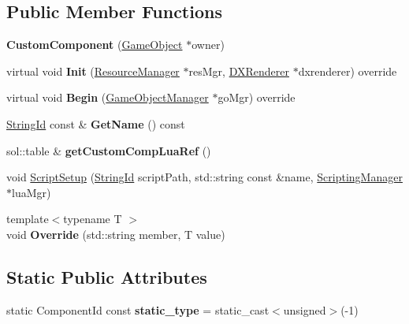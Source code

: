 \subsection*{Public Member Functions}
\begin{DoxyCompactItemize}
\item 
\mbox{\label{classCustomComponent_a748e48455ac06076251485d3a112140f}} 
{\bfseries Custom\+Component} (\hyperlink{classGameObject}{Game\+Object} $\ast$owner)
\item 
\mbox{\label{classCustomComponent_a614f2af8f444be376d83cc00f6b9c7ea}} 
virtual void {\bfseries Init} (\hyperlink{classResourceManager}{Resource\+Manager} $\ast$res\+Mgr, \hyperlink{classDXRenderer}{D\+X\+Renderer} $\ast$dxrenderer) override
\item 
\mbox{\label{classCustomComponent_a4c2ecd49242b844479cbee2e9385371b}} 
virtual void {\bfseries Begin} (\hyperlink{classGameObjectManager}{Game\+Object\+Manager} $\ast$go\+Mgr) override
\item 
\mbox{\label{classCustomComponent_aefb68297be52020412723f27a3c003f0}} 
\hyperlink{classStringId}{String\+Id} const  \& {\bfseries Get\+Name} () const
\item 
\mbox{\label{classCustomComponent_a5d59a3fcc75fbe18c2d2ab9d1fe76576}} 
sol\+::table \& {\bfseries get\+Custom\+Comp\+Lua\+Ref} ()
\item 
void \hyperlink{classCustomComponent_ac540fc607bb502790276815b55890c98}{Script\+Setup} (\hyperlink{classStringId}{String\+Id} script\+Path, std\+::string const \&name, \hyperlink{classScriptingManager}{Scripting\+Manager} $\ast$lua\+Mgr)
\item 
\mbox{\label{classCustomComponent_ab3107db0a720c77d00f9b73060cbcef3}} 
{\footnotesize template$<$typename T $>$ }\\void {\bfseries Override} (std\+::string member, T value)
\end{DoxyCompactItemize}
\subsection*{Static Public Attributes}
\begin{DoxyCompactItemize}
\item 
\mbox{\label{classCustomComponent_ae490cb396ab9ececc0a619a323929bfc}} 
static Component\+Id const {\bfseries static\+\_\+type} = static\+\_\+cast$<$unsigned$>$(-\/1)
\end{DoxyCompactItemize}
